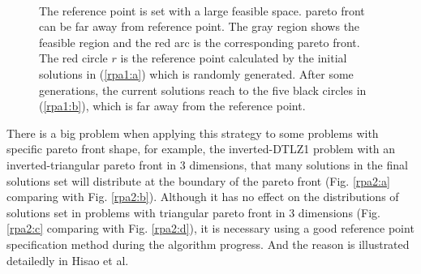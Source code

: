 \documentclass[conference]{IEEEtran}
\begin{document}
\begin{figure}[!t]
  \centering
  \quad
  \\
  \caption{The reference point is set with a large feasible space.
  pareto front can be far away from reference point.
  The gray region shows the feasible region and the red arc is the corresponding pareto front.
  The red circle $r$ is the reference point calculated by the initial solutions in (\ref{rpa1:a})
  which is randomly generated.
  After some generations, the current solutions reach to the five black circles in (\ref{rpa1:b}), 
  which is far away from the reference point.}
  \label{rpa1}
\end{figure}

There is a big problem when applying this strategy to some problems with specific pareto front shape, 
for example, the inverted-DTLZ1 problem with an inverted-triangular pareto front in 3 dimensions,
that many solutions in the final solutions set will distribute at the boundary of the pareto front
(Fig. \ref{rpa2:a} comparing with Fig. \ref{rpa2:b})\cite{hisao:RPexplanation, hisao:RPspecify, hisao:dynamic}. 
Although it has no effect on the distributions of solutions set 
in problems with triangular pareto front in 3 dimensions 
(Fig. \ref{rpa2:c} comparing with Fig. \ref{rpa2:d}), 
it is necessary using a good reference point specification method during the algorithm progress.
And the reason is illustrated detailedly in Hisao et al\cite{hisao:RPexplanation}.
\end{document}
